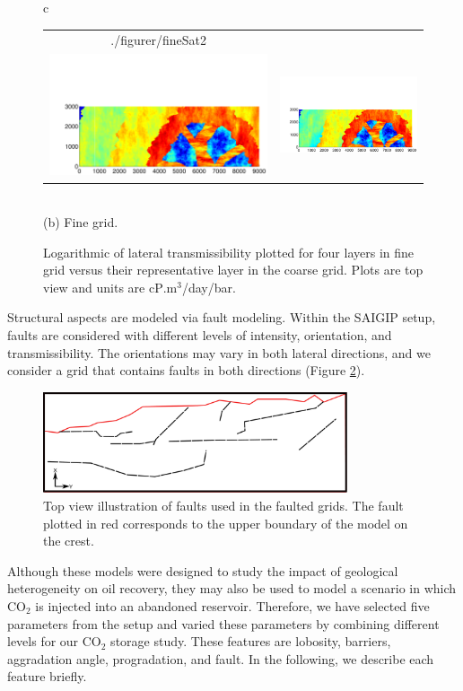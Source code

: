 \begin{figure}
\begin{tabular}{c}
\begin{minipage}{1\textwidth}
\begin{tabular}{cc}
{./figurer/fineSat2}\\
\includegraphics[trim=0.5cm 0cm 0cm 2.5cm, clip=true,width=0.5 \linewidth]
{./figurer/fineSat3}&
\includegraphics[trim=0.5cm 0cm 0cm 2.5cm, clip=true,width=0.5 \linewidth]
{./figurer/fineSat4}
\end{tabular}
\end{minipage}\\(b) Fine grid.
\end{tabular}
\caption{Logarithmic of lateral transmissibility plotted for four layers in fine grid versus their representative layer in the coarse grid. Plots are top view and units are cP$.$m$^3$/day/bar.}
\label{fig:upsat}
\end{figure}

Structural aspects are modeled via fault modeling. Within the SAIGIP setup, faults are considered with different levels of intensity, orientation, and transmissibility. The orientations may vary in both lateral directions, and we consider a grid that contains faults in both directions (Figure \ref{fig:fltGrd}).

\begin{figure}
\centering
\includegraphics[width=0.8\textwidth]{./figurer/faultedGrid}
\caption{Top view illustration of faults used in the faulted grids. The fault plotted in red corresponds to the upper boundary of the model on the crest.}
\label{fig:fltGrd}
\end{figure}
Although these models were designed to study the impact of geological
heterogeneity on oil recovery, they may also be used to model a scenario in
which $\mbox{CO}_2$ is injected into an abandoned reservoir. Therefore, we have
selected five parameters from the setup and varied these parameters by combining
different levels for our $\mbox{CO}_2$ storage study. These features are
lobosity, barriers, aggradation angle, progradation, and fault. In the
following, we describe each feature briefly.


